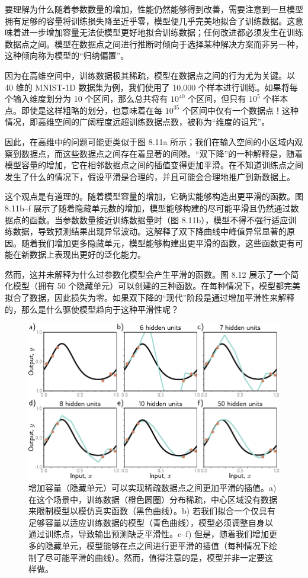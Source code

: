\documentclass[lang=cn,newtx,10pt,scheme=chinese]{elegantbook}
\begin{document}
要理解为什么随着参数数量的增加，性能仍然能够得到改善，需要注意到一旦模型拥有足够的容量将训练损失降至近乎零，模型便几乎完美地拟合了训练数据。这意味着进一步增加容量无法使模型更好地拟合训练数据；任何改进都必须发生在训练数据点之间。模型在数据点之间进行推断时倾向于选择某种解决方案而非另一种，这种倾向称为模型的“归纳偏置”。

因为在高维空间中，训练数据极其稀疏，模型在数据点之间的行为尤为关键。以 40 维的 MNIST-1D 数据集为例，我们使用了 10,000 个样本进行训练。如果将每个输入维度划分为 10 个区间，那么总共将有 $10^40$ 个区间，但只有 $10^5$ 个样本点。即使是这样粗略的划分，也意味着在每 $10^35$ 个区间中仅有一个数据点！这种情况，即高维空间的广阔程度远超训练数据点数，被称为“维度的诅咒”。

因此，在高维中的问题可能更类似于图 8.11a 所示；我们在输入空间的小区域内观察到数据点，而这些数据点之间存在着显著的间隙。“双下降”的一种解释是，随着模型容量的增加，它在相邻数据点之间的插值变得更加平滑。在不知道训练点之间发生了什么的情况下，假设平滑是合理的，并且可能会合理地推广到新数据上。

这个观点是有道理的。随着模型容量的增加，它确实能够构造出更平滑的函数。图 8.11b–f 展示了随着隐藏单元数的增加，模型能够构建的尽可能平滑且仍然通过数据点的函数。当参数数量接近训练数据量时（图 8.11b），模型不得不强行适应训练数据，导致预测结果出现异常波动。这解释了双下降曲线中峰值异常显著的原因。随着我们增加更多隐藏单元，模型能够构建出更平滑的函数，这些函数更有可能在新数据上表现出更好的泛化能力。

然而，这并未解释为什么过参数化模型会产生平滑的函数。图 8.12 展示了一个简化模型（拥有 50 个隐藏单元）可以创建的三种函数。在每种情况下，模型都完美拟合了数据，因此损失为零。如果双下降的“现代”阶段是通过增加平滑性来解释的，那么是什么驱使模型趋向于这种平滑性呢？

\begin{figure}[ht!]
\centering
\includegraphics[width=0.7\linewidth]{PDFFigures/UDLChap8PDF/PerfSmoothness.pdf}
\caption{增加容量（隐藏单元）可以实现稀疏数据点之间更加平滑的插值。a) 在这个场景中，训练数据（橙色圆圈）分布稀疏，中心区域没有数据来限制模型以模仿真实函数（黑色曲线）。b) 若我们拟合一个仅具有足够容量以适应训练数据的模型（青色曲线），模型必须调整自身以通过训练点，导致输出预测缺乏平滑性。c–f) 但是，随着我们增加更多的隐藏单元，模型能够在点之间进行更平滑的插值（每种情况下绘制了尽可能平滑的曲线）。然而，值得注意的是，模型并非一定要这样做。}
\end{figure}
\end{document}

